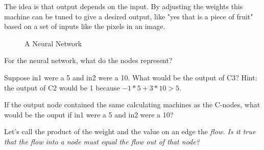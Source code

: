 The idea is that output depends on the input. By adjusting the weights this machine can be tuned to give a desired output, like "yes that is a piece of fruit" based on a set of inputs like the pixels in an image.
\begin{figure}[H]
\begin{center}
\caption{A Neural Network}
\label{F:1NN}
\end{center}
\end{figure}

\begin{alevel}
For the neural network, what do the nodes represent?
\end{alevel}

\begin{blevel}
Suppose in1 were a 5 and in2 were a 10. What would be the output of C3? Hint: the output of C2 would be 1 because $-1*5+3*10 > 5$.
\end{blevel}

\begin{clevel}
If the output node contained the same calculating machines as the C-nodes, what would be the ouput if in1 were a 5 and in2 were a 10? 
\end{clevel}

\begin{clevel}
Let's call the product of the weight and the value on an edge the \em{flow}. Is it true that the flow into a node must equal the flow out of that node? 
\end{clevel}

